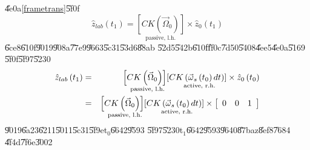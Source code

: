 \documentclass[12pt,a4paper]{article}
\begin{document}
\U{4e0a}\ref{frametrans}\U{5f0f}%
\begin{equation*}
\hat{z}_{lab}\left( t_{1}\right) =\underset{\text{passive, l.h.}}{\left[
CK\left( \vec{\Omega}_{0}\right) \right] }\times \hat{z}_{0}\left(
t_{1}\right)
\end{equation*}%
\U{6ce8}\U{610f}\U{9019}\U{908a}\U{77e9}\U{9663}\U{5c31}\U{53d6}\U{88ab}%
\U{52d5}\U{542b}\U{610f}\U{ff0c}\U{7d50}\U{5408}\U{4ee5}\U{4e0a}\U{5169}%
\U{5f0f}\U{5f97}\U{5230}%
\begin{eqnarray*}
\hat{z}_{lab}\left( t_{1}\right) &=&\underset{\text{passive, l.h.}}{\left[
CK\left( \vec{\Omega}_{0}\right) \right] }\underset{\text{active, r.h.}}{%
\left[ CK\left( \vec{\omega}_{s}\left( t_{0}\right) dt\right) \right] }%
\times \hat{z}_{0}\left( t_{0}\right) \\
&=&\underset{\text{passive, l.h.}}{\left[ CK\left( \vec{\Omega}_{0}\right) %
\right] }\underset{\text{active, r.h.}}{\left[ CK\left( \vec{\omega}%
_{s}\left( t_{0}\right) dt\right) \right] }\times \left[ 
\begin{array}{ccc}
0 & 0 & 1%
\end{array}%
\right]
\end{eqnarray*}%
\U{9019}\U{6a23}\U{6211}\U{5011}\U{5c31}\U{5f9e}t$_{0}$\U{6642}\U{9593}%
\U{5f97}\U{5230}t$_{1}$\U{6642}\U{9593}\U{9640}\U{87ba}z\U{8ef8}\U{7684}%
\U{4f4d}\U{7f6e}\U{3002}
\end{document}

